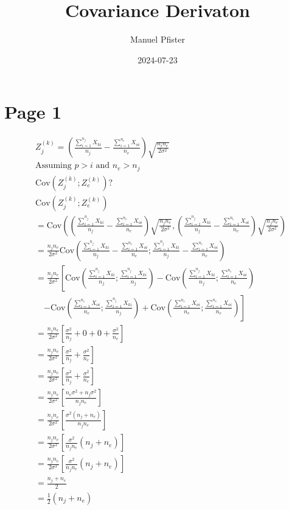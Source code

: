 \documentclass[
]{article}
\title{Covariance Derivaton}
\author{Manuel Pfister}
\date{2024-07-23}
\begin{document}
\maketitle

\section*{Page 1}

\begin{align*}
& Z_j^{(k)} = \left(\frac{\sum_{i=1}^{n_j} X_{ki}}{n_j} - \frac{\sum_{i=1}^{n_e} X_{oi}}{n_e}\right) \sqrt{\frac{n_i n_e}{2\sigma^2}} \tag{1} \\
& \text{Assuming } p > i \text{ and } n_e > n_j \\
& \text{Cov}\left(Z_j^{(k)}; Z_e^{(k)}\right)? \\
& \text{Cov}\left(Z_j^{(k)}; Z_e^{(k)}\right) \\
& = \text{Cov} \left( \left( \frac{\sum_{i=1}^{n_j} X_{ki}}{n_j} - \frac{\sum_{i=1}^{n_e} X_{oi}}{n_e} \right) \sqrt{\frac{n_j n_e}{2 \sigma^2}}, \left( \frac{\sum_{i=1}^{n_j} X_{ki}}{n_j} - \frac{\sum_{i=1}^{n_e} X_{oi}}{n_e} \right) \sqrt{\frac{n_j n_e}{2 \sigma^2}} \right) \\
& = \frac{n_j n_e}{2 \sigma^2} \text{Cov} \left( \frac{\sum_{i=1}^{n_j} X_{ki}}{n_j} - \frac{\sum_{i=1}^{n_e} X_{oi}}{n_e}; \frac{\sum_{i=1}^{n_j} X_{ki}}{n_j} - \frac{\sum_{i=1}^{n_e} X_{oi}}{n_e} \right) \\
& = \frac{n_j n_e}{2 \sigma^2} \left[ \text{Cov} \left( \frac{\sum_{i=1}^{n_j} X_{ki}}{n_j}; \frac{\sum_{i=1}^{n_j} X_{ki}}{n_j} \right) - \text{Cov} \left( \frac{\sum_{i=1}^{n_j} X_{ki}}{n_j}; \frac{\sum_{i=1}^{n_e} X_{oi}}{n_e} \right) \right. \\
& \quad \left. - \text{Cov} \left( \frac{\sum_{i=1}^{n_e} X_{oi}}{n_e}; \frac{\sum_{i=1}^{n_j} X_{ki}}{n_j} \right) + \text{Cov} \left( \frac{\sum_{i=1}^{n_e} X_{oi}}{n_e}; \frac{\sum_{i=1}^{n_e} X_{oi}}{n_e} \right) \right] \\
& = \frac{n_j n_e}{2 \sigma^2} \left[ \frac{\sigma^2}{n_j} + 0 + 0 + \frac{\sigma^2}{n_e} \right] \\
& = \frac{n_j n_e}{2 \sigma^2} \left[ \frac{\sigma^2}{n_j} + \frac{\sigma^2}{n_e} \right] \\
& = \frac{n_j n_e}{2 \sigma^2} \left[ \frac{\sigma^2}{n_j} + \frac{\sigma^2}{n_e} \right] \\
& = \frac{n_j n_e}{2 \sigma^2} \left[ \frac{n_e \sigma^2 + n_j \sigma^2}{n_j n_e} \right] \\
& = \frac{n_j n_e}{2 \sigma^2} \left[ \frac{\sigma^2 (n_j + n_e)}{n_j n_e} \right] \\
& = \frac{n_j n_e}{2 \sigma^2} \left[ \frac{\sigma^2}{n_j n_e} (n_j + n_e) \right] \\
& = \frac{n_j n_e}{2 \sigma^2} \left[ \frac{\sigma^2}{n_j n_e} (n_j + n_e) \right] \\
& = \frac{n_j + n_e}{2} \\
& = \frac{1}{2} (n_j + n_e)
\end{align*}
\end{document}
